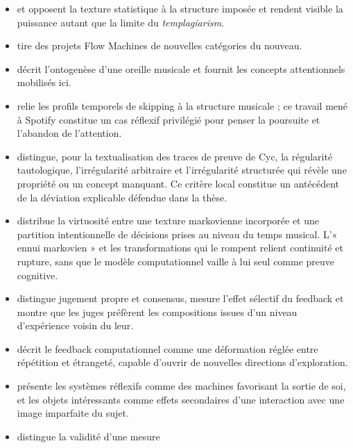 \documentclass[11pt,a4paper]{article}
\begin{document}
\begin{itemize}
  \item \textcite{ghedini2015flowmachines} et
        \textcite{pachet2017variations} opposent la texture statistique à la
        structure imposée et rendent visible la puissance autant que la limite du
        \emph{templagiarism}.
  \item \textcite{pachet2021assisted} tire des projets Flow Machines de nouvelles
        catégories du nouveau.
  \item \textcite{pachet2018oreille} décrit l'ontogenèse d'une oreille musicale
        et fournit les concepts attentionnels mobilisés ici.
  \item \textcite{montecchio2020skipping} relie les profils temporels de
        skipping à la structure musicale ; ce travail mené à Spotify constitue
        un cas réflexif privilégié pour penser la poursuite et l'abandon de
        l'attention.
  \item \textcite{milipachet1995regularity} distingue, pour la textualisation
        des traces de preuve de Cyc, la régularité tautologique, l'irrégularité
        arbitraire et l'irrégularité structurée qui révèle une propriété ou un
        concept manquant. Ce critère local constitue un antécédent de la
        déviation explicable défendue dans la thèse.
  \item \textcite{pachet2012virtuosity} distribue la virtuosité entre une
        texture markovienne incorporée et une partition intentionnelle de
        décisions prises au niveau du temps musical. L'« ennui markovien » et
        les transformations qui le rompent relient continuité et rupture, sans
        que le modèle computationnel vaille à lui seul comme preuve cognitive.
  \item \textcite{martin2016creativeprocess} distingue jugement propre et
        consensus, mesure l'effet sélectif du feedback et montre que les juges
        préfèrent les compositions issues d'un niveau d'expérience voisin du leur.
  \item \textcite{jones2009stimulating} décrit le feedback computationnel comme
        une déformation réglée entre répétition et étrangeté, capable d'ouvrir de
        nouvelles directions d'exploration.
  \item \textcite{pachet2008machines} présente les systèmes réflexifs comme des
        machines favorisant la sortie de soi, et les objets intéressants comme
        effets secondaires d'une interaction avec une image imparfaite du sujet.\par
  \item \textcite{aucouturier2002similarity} distingue la validité d'une mesure

\end{itemize}
\end{document}
